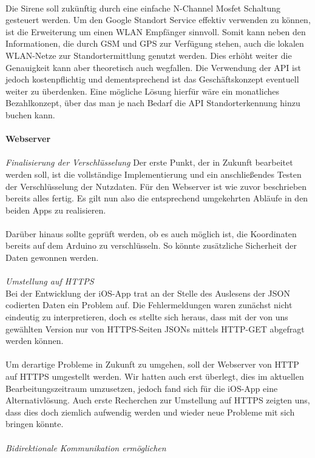 \\
Die Sirene soll zukünftig durch eine einfache N-Channel Mosfet Schaltung gesteuert werden.
Um den Google Standort Service effektiv verwenden zu können, ist die Erweiterung um einen WLAN Empfänger sinnvoll. Somit kann neben den Informationen, die durch GSM und GPS zur Verfügung stehen, auch die lokalen WLAN-Netze zur Standortermittlung genutzt werden. Dies erhöht weiter die Genauigkeit kann aber theoretisch auch wegfallen. Die Verwendung der API ist jedoch kostenpflichtig und dementsprechend ist das Geschäftskonzept eventuell weiter zu überdenken. Eine mögliche Lösung hierfür wäre ein monatliches Bezahlkonzept, über das man je nach Bedarf die API Standorterkennung hinzu buchen kann.
\\
\\
\textbf{Webserver} 
\\
\\
\textit{Finalisierung der Verschlüsselung}
Der erste Punkt, der in Zukunft bearbeitet werden soll, ist die vollständige Implementierung und ein anschließendes Testen der Verschlüsselung der Nutzdaten. Für den Webserver ist wie zuvor beschrieben bereits alles fertig. Es gilt nun also die entsprechend umgekehrten Abläufe in den beiden Apps zu realisieren.
\\
\\
Darüber hinaus sollte geprüft werden, ob es auch möglich ist, die Koordinaten bereits auf dem Arduino zu verschlüsseln. So könnte zusätzliche Sicherheit der Daten gewonnen werden.
\\
\\
\textit{Umstellung auf HTTPS}
\\
Bei der Entwicklung der iOS-App trat an der Stelle des Auslesens der JSON codierten Daten ein Problem auf. Die Fehlermeldungen waren zunächst nicht eindeutig zu interpretieren, doch es stellte sich heraus, dass mit der von uns gewählten Version nur von HTTPS-Seiten JSONs mittels HTTP-GET abgefragt werden können.
\\
\\
Um derartige Probleme in Zukunft zu umgehen, soll der Webserver von HTTP auf HTTPS umgestellt werden. Wir hatten auch erst überlegt, dies im aktuellen Bearbeitungszeitraum umzusetzen, jedoch fand sich für die iOS-App eine Alternativlösung. Auch erste Recherchen zur Umstellung auf HTTPS zeigten uns, dass dies doch ziemlich aufwendig werden und wieder neue Probleme mit sich bringen könnte.
\\
\\
\textit{Bidirektionale Kommunikation ermöglichen}
